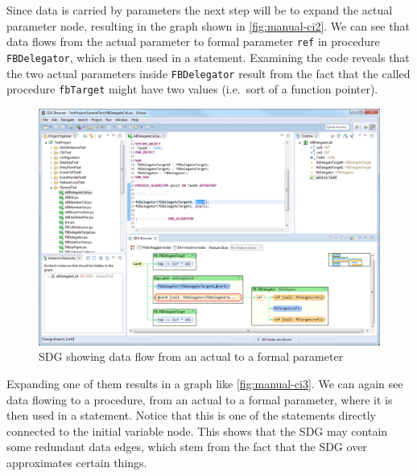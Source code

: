 Since data is carried by parameters the next step will be to expand the actual parameter node, resulting in the graph 
shown in \autoref{fig:manual-ci2}. We can see that data flows from the actual parameter to formal parameter 
\lstinline|ref| in procedure \lstinline|FBDelegator|, which is then used in a statement. Examining the code reveals 
that the two actual parameters inside \lstinline|FBDelegator| result from the fact that the called procedure 
\lstinline|fbTarget| might have two values (i.e.\ sort of a function pointer).

\begin{figure}[hpb]
  \centering
    \includegraphics[width=\textwidth]{bilder/manual-ci2}
  \caption{SDG showing data flow from an actual to a formal parameter}
  \label{fig:manual-ci2}
\end{figure}

Expanding one of them results in a graph like \autoref{fig:manual-ci3}. We can again see data flowing to a procedure, 
from an actual to a formal parameter, where it is then used in a statement. Notice that this is one of the statements 
directly connected to the initial variable node. This shows that the SDG may contain some redundant data edges, which 
stem from the fact that the SDG over approximates certain things.

